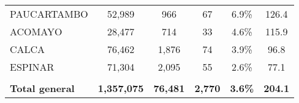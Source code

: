 \begin{tabular}{lccccc}
	\cellcolor[HTML]{FFE699}PAUCARTAMBO                             & 52,989               & 966                        & 67                   & 6.9\%                      & 126.4                                       \\
	\cellcolor[HTML]{FFE699}ACOMAYO                                 & 28,477               & 714                        & 33                   & 4.6\%                      & 115.9                                       \\
	\cellcolor[HTML]{FFE699}CALCA                                   & 76,462               & 1,876                      & 74                   & 3.9\%                      & 96.8                                        \\
	\cellcolor[HTML]{FFE699}ESPINAR                                 & 71,304               & 2,095                      & 55                   & 2.6\%                      & 77.1                                        \\
	& \multicolumn{1}{l}{} & \multicolumn{1}{l}{}       & \multicolumn{1}{l}{} & \multicolumn{1}{l}{}       & \multicolumn{1}{l}{}                        \\
	\rowcolor[HTML]{DDEBF7} 
	\textbf{Total general}                                          & \textbf{1,357,075}   & \textbf{76,481}            & \textbf{2,770}       & \textbf{3.6\%}             & \textbf{204.1}                             
\end{tabular}